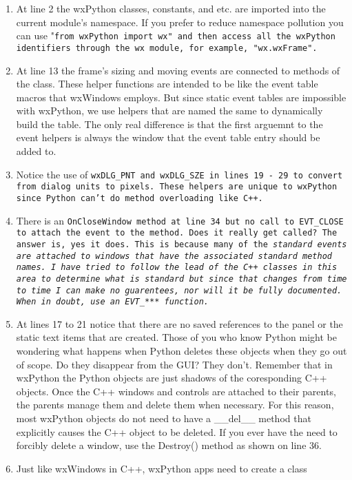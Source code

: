 
\begin{enumerate}\itemsep=11pt
\item At line 2 the wxPython classes, constants, and etc. are imported
into the current module's namespace. If you prefer to reduce
namespace pollution you can use "\tt{from wxPython import wx}" and
then access all the wxPython identifiers through the wx module, for
example, "\tt{wx.wxFrame}".
\item At line 13 the frame's sizing and moving events are connected to
methods of the class. These helper functions are intended to be like
the event table macros that wxWindows employs. But since static event
tables are impossible with wxPython, we use helpers that are named the
same to dynamically build the table. The only real difference is
that the first arguemnt to the event helpers is always the window that
the event table entry should be added to.
\item Notice the use of \tt{wxDLG\_PNT} and \tt{wxDLG\_SZE} in lines 19
- 29 to convert from dialog units to pixels. These helpers are unique
to wxPython since Python can't do method overloading like C++.
\item There is an \tt{OnCloseWindow} method at line 34 but no call to
EVT\_CLOSE to attach the event to the method. Does it really get
called?  The answer is, yes it does. This is because many of the
\em{standard} events are attached to windows that have the associated
\em{standard} method names. I have tried to follow the lead of the
C++ classes in this area to determine what is \em{standard} but since
that changes from time to time I can make no guarentees, nor will it
be fully documented. When in doubt, use an EVT\_*** function.
\item At lines 17 to 21 notice that there are no saved references to
the panel or the static text items that are created. Those of you
who know Python might be wondering what happens when Python deletes
these objects when they go out of scope. Do they disappear from the GUI?  They
don't. Remember that in wxPython the Python objects are just shadows of the
coresponding C++ objects. Once the C++ windows and controls are
attached to their parents, the parents manage them and delete them
when necessary. For this reason, most wxPython objects do not need to
have a \_\_del\_\_ method that explicitly causes the C++ object to be
deleted. If you ever have the need to forcibly delete a window, use
the Destroy() method as shown on line 36.
\item Just like wxWindows in C++, wxPython apps need to create a class

\end{enumerate}
